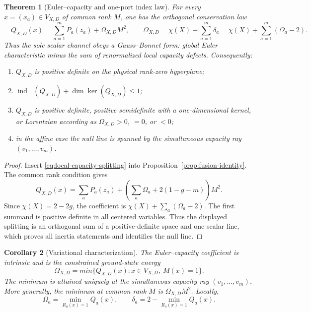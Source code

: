 \documentclass[11pt,a4paper]{amsart}
\theoremstyle{plain}
\newtheorem{theorem}{Theorem}[section]
\newtheorem{corollary}[theorem]{Corollary}
\theoremstyle{definition}
\newcommand{\indm}{\operatorname{ind}_{-}}
\begin{document}
\begin{theorem}[Euler--capacity and one-port index law]\label{thm:stokes-hodge}
For every $x=(x_a)\in V_{X,D}$ of common rank $M$, one has the orthogonal conservation law
\begin{equation}\label{eq:euler-capacity-law}
 \boxed{\quad Q_{X,D}(x)=\sum_{a=1}^mP_a(z_a)+\Omega_{X,D}M^2,\qquad
 \Omega_{X,D}=\chi(X)-\sum_{a=1}^m\delta_a
 =\chi(X)+\sum_{a=1}^m(\Omega_a-2).\quad}
\end{equation}
Thus the sole scalar channel obeys a Gauss--Bonnet form: global Euler characteristic minus the sum
of renormalized local capacity defects.
Consequently:
\begin{enumerate}[label=(\roman*),leftmargin=2.2em]
\item $Q_{X,D}$ is positive definite on the physical rank-zero hyperplane;
\item $\indm(Q_{X,D})+\dim\ker(Q_{X,D})\le1$;
\item $Q_{X,D}$ is positive definite, positive semidefinite with a one-dimensional kernel, or
Lorentzian according as $\Omega_{X,D}>0$, $=0$, or $<0$;
\item in the affine case the null line is spanned by the simultaneous capacity ray
$(v_1,\ldots,v_m)$.
\end{enumerate}
\end{theorem}

\begin{proof}
Insert \eqref{eq:local-capacity-splitting} into Proposition~\ref{prop:fusion-identity}.  The common
rank condition gives
\[
 Q_{X,D}(x)=\sum_aP_a(z_a)
 +\left(\sum_a\Omega_a+2(1-g-m)\right)M^2.
\]
Since $\chi(X)=2-2g$, the coefficient is
$\chi(X)+\sum_a(\Omega_a-2)$.  The first summand is positive definite in all centered variables.
Thus the displayed splitting is an orthogonal sum of a positive-definite space and one scalar
line, which proves all inertia statements and identifies the null line.
\end{proof}

\begin{corollary}[Variational characterization]\label{cor:variational-gap}
The Euler--capacity coefficient is intrinsic and is the constrained ground-state energy
\begin{equation}\label{eq:global-variational-gap}
 \boxed{\quad \Omega_{X,D}=min\{Q_{X,D}(x):x\in V_{X,D},\ M(x)=1\}.\quad}
\end{equation}
The minimum is attained uniquely at the simultaneous capacity ray $(v_1,\ldots,v_m)$.  More
generally, the minimum at common rank $M$ is $\Omega_{X,D}M^2$.  Locally,
\begin{equation}\label{eq:local-defect-variational}
 \Omega_a=\min_{R_a(x)=1}Q_a(x),\qquad
 \delta_a=2-\min_{R_a(x)=1}Q_a(x).
\end{equation}
\end{corollary}
\end{document}
